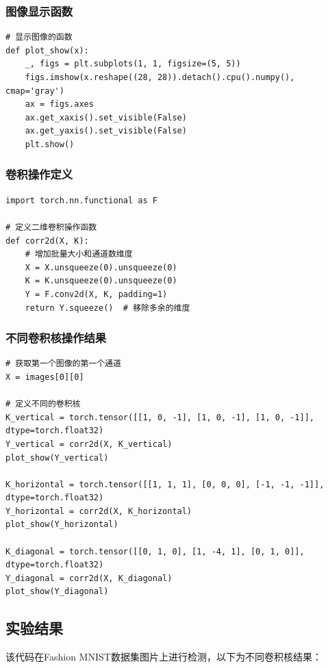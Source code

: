 \documentclass[a4paper,12pt]{article}
\begin{document}
\subsubsection{图像显示函数}
\begin{lstlisting}
# 显示图像的函数
def plot_show(x):
    _, figs = plt.subplots(1, 1, figsize=(5, 5))
    figs.imshow(x.reshape((28, 28)).detach().cpu().numpy(), cmap='gray')
    ax = figs.axes
    ax.get_xaxis().set_visible(False)
    ax.get_yaxis().set_visible(False)
    plt.show()

\end{lstlisting}

\subsubsection{卷积操作定义}
\begin{lstlisting}
import torch.nn.functional as F

# 定义二维卷积操作函数
def corr2d(X, K):
    # 增加批量大小和通道数维度
    X = X.unsqueeze(0).unsqueeze(0)
    K = K.unsqueeze(0).unsqueeze(0)
    Y = F.conv2d(X, K, padding=1)
    return Y.squeeze()  # 移除多余的维度
\end{lstlisting}

\subsubsection{不同卷积核操作结果}
\begin{lstlisting}
# 获取第一个图像的第一个通道
X = images[0][0]

# 定义不同的卷积核
K_vertical = torch.tensor([[1, 0, -1], [1, 0, -1], [1, 0, -1]], dtype=torch.float32)
Y_vertical = corr2d(X, K_vertical)
plot_show(Y_vertical)

K_horizontal = torch.tensor([[1, 1, 1], [0, 0, 0], [-1, -1, -1]], dtype=torch.float32)
Y_horizontal = corr2d(X, K_horizontal)
plot_show(Y_horizontal)

K_diagonal = torch.tensor([[0, 1, 0], [1, -4, 1], [0, 1, 0]], dtype=torch.float32)
Y_diagonal = corr2d(X, K_diagonal)
plot_show(Y_diagonal)
\end{lstlisting}

\subsection{实验结果}
该代码在Fashion MNIST数据集图片上进行检测，以下为不同卷积核结果：
\end{document}
